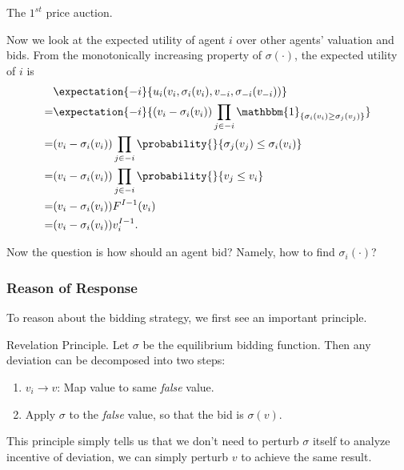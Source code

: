 \begin{prev}
	The \(1^{st}\) price auction.
\end{prev}

Now we look at the expected utility of agent \(i\) over other agents' valuation and bids. From the monotonically increasing property
of \(\sigma(\cdot)\), the expected utility of \(i\) is
\[
	\begin{split}
		&\expectation{-i}{u_{i}(v_{i}, \sigma_{i}(v_{i}), v_{-i}, \sigma_{-i}(v_{-i}))}\\
		= &\expectation{-i}{(v_{i} - \sigma_{i}(v_{i})) \prod\limits_{j\in -i}\mathbbm{1}_{\{ \sigma_{i}(v_{i})\geq \sigma_{j}(v_{j}) \}}}\\
		= &(v_{i} - \sigma_{i}(v_{i}))\prod\limits_{j\in -i}\probability{}{\sigma_{j}(v_{j})\leq \sigma_{i}(v_{i})}\\
		= &(v_{i} - \sigma_{i}(v_{i}))\prod\limits_{j\in -i}\probability{}{v_{j}\leq v_{i}}\\
		= &(v_{i} - \sigma_{i}(v_{i}))F^{I-1}(v_{i})\\
		= &(v_{i} - \sigma_{i}(v_{i}))v_{i}^{I-1}.
	\end{split}
\]

\hr

Now the question is how should an agent bid? Namely, how to find \(\sigma_{i}(\cdot)\)?
\subsubsection{Reason of Response}
To reason about the bidding strategy, we first see an important principle.
\begin{theorem}
	\label{Revelation-Principle}
	Revelation Principle. Let \(\sigma\) be the equilibrium bidding function. Then any deviation can be decomposed into two steps:
	\begin{enumerate}
		\item \(v_{i}\to v\): Map value to same \emph{false} value.
		\item Apply \(\sigma\) to the \emph{false} value, so that the bid is \(\sigma(v)\).
	\end{enumerate}
\end{theorem}

\begin{intuition}
	This principle simply tells us that we don't need to perturb \(\sigma\) itself to analyze incentive of deviation, we can simply perturb \(v\) to achieve
	the same result.
\end{intuition}

